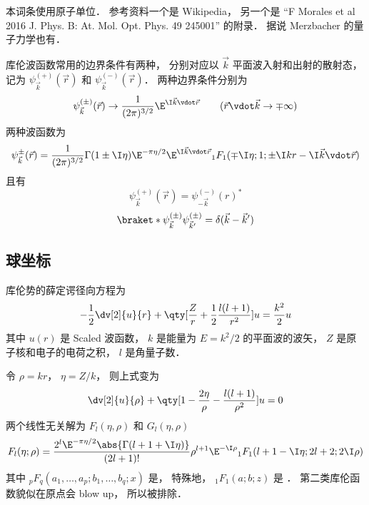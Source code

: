 
本词条使用原子单位． 参考资料一个是 Wikipedia， 另一个是 “F Morales et al 2016 J. Phys. B: At. Mol. Opt. Phys. 49 245001” 的附录． 据说 Merzbacher 的量子力学也有．

库伦波函数常用的边界条件有两种， 分别对应以 $\vec k$ 平面波入射和出射的散射态， 记为 $\psi_{\vec k}^{(+)}(\vec r)$ 和 $\psi_{\vec k}^{(-)}(\vec r)$． 两种边界条件分别为
\begin{equation}
\psi_{\vec k}^{(\pm)}(\vec r) \to \frac{1}{(2\pi)^{3/2}} \E^{\I\vec k\vdot\vec r}
\qquad
(\vec r\vdot \vec k \to \mp\infty)
\end{equation}
两种波函数为
\begin{equation}
\psi_{\vec k}^{\pm}(\vec r) = \frac{1}{(2\pi)^{3/2}} \Gamma(1\pm \I\eta)\E^{-\pi\eta/2} \E^{\I\vec k\vdot\vec r} {_1F_1}(\mp\I\eta; 1; \pm\I kr - \I \vec k\vdot \vec r)
\end{equation}
且有
\begin{equation}
\psi_{\vec k}^{(+)}(\vec r) = \psi_{-\vec k}^{(-)}(r)^*
\end{equation}
\begin{equation}
\braket*{\psi_{\vec k}^{(\pm)}}{\psi_{\vec k'}^{(\pm)}} = \delta(\vec k - \vec k')
\end{equation}

\subsection{球坐标}
库伦势的薛定谔径向方程为
\begin{equation}
-\frac12 \dv[2]{u}{r} + \qty[\frac{Z}{r} + \frac12 \frac{l(l+1)}{r^2}]u = \frac{k^2}{2}u
\end{equation}
其中 $u(r)$ 是 Scaled 波函数， $k$ 是能量为 $E = k^2/2$ 的平面波的波矢， $Z$ 是原子核和电子的电荷之积， $l$ 是角量子数．

令 $\rho = kr$， $\eta = Z/k$， 则上式变为
\begin{equation}
\dv[2]{u}{\rho} + \qty[1 - \frac{2\eta}{\rho} - \frac{l(l+1)}{\rho^2}]u = 0
\end{equation}
两个线性无关解为 $F_l(\eta, \rho)$ 和  $G_l(\eta, \rho)$
\begin{equation}
F_l(\eta; \rho) = \frac{2^l \E^{-\pi\eta/2} \abs{\Gamma(l+1+\I\eta)}}{(2l+1)!}
\rho^{l+1} \E^{-\I\rho} {_1F_1}(l+1-\I\eta; 2l+2; 2\I\rho)
\end{equation}
其中 $_p F_q(a_1,\dots,a_p; b_1,\dots,b_q; x)$ 是， 特殊地， $_1 F_1(a;b;z)$ 是 ． 第二类库伦函数貌似在原点会 blow up， 所以被排除．

